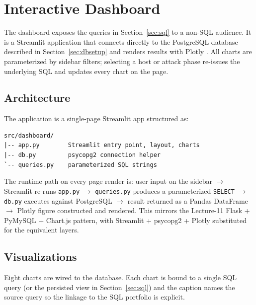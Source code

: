 \section{Interactive Dashboard}
\label{sec:dashboard}

The dashboard exposes the queries in Section~\ref{sec:sql} to a non-SQL
audience. It is a Streamlit \cite{streamlit} application that connects
directly to the PostgreSQL database described in Section~\ref{sec:dbsetup}
and renders results with Plotly \cite{plotly}. All charts are
parameterized by sidebar filters; selecting a host or attack phase
re-issues the underlying SQL and updates every chart on the page.

\subsection{Architecture}
The application is a single-page Streamlit app structured as:

\begin{verbatim}
src/dashboard/
|-- app.py        Streamlit entry point, layout, charts
|-- db.py         psycopg2 connection helper
`-- queries.py    parameterized SQL strings
\end{verbatim}

The runtime path on every page render is: user input on the sidebar
$\rightarrow$ Streamlit re-runs \texttt{app.py} $\rightarrow$
\texttt{queries.py} produces a parameterized \texttt{SELECT}
$\rightarrow$ \texttt{db.py} executes against PostgreSQL $\rightarrow$
result returned as a Pandas DataFrame $\rightarrow$ Plotly figure
constructed and rendered. This mirrors the Lecture-11 Flask + PyMySQL +
Chart.js pattern, with Streamlit + psycopg2 + Plotly substituted for the
equivalent layers.

\subsection{Visualizations}
Eight charts are wired to the database. Each chart is bound to a single
SQL query (or the persisted view in Section~\ref{sec:sql}) and the
caption names the source query so the linkage to the SQL portfolio is
explicit.

